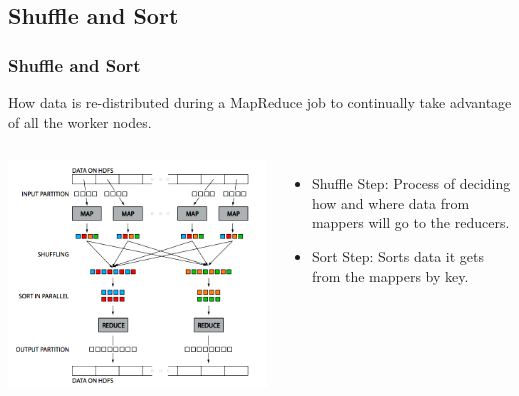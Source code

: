 \documentclass{beamer}
\begin{document}
\subsection{Shuffle and Sort}
\begin{frame}
  \frametitle{Shuffle and Sort}
  \parbox{\linewidth}{How data is re-distributed during a MapReduce job to continually take advantage of all the worker nodes.} \vspace{2mm}
  \begin{columns}
    \begin{center}
      \includegraphics[width=\textwidth]{../images/shuffle_sort.png}
    \end{center}
    \begin{itemize}
      \item \alert{Shuffle Step}: Process of deciding how and where data from mappers will go to the reducers.
      \vspace{1mm}
      \item \alert{Sort Step}: Sorts data it gets from the mappers by key.
    \end{itemize}
  \end{columns}
\end{frame}
\end{document}
